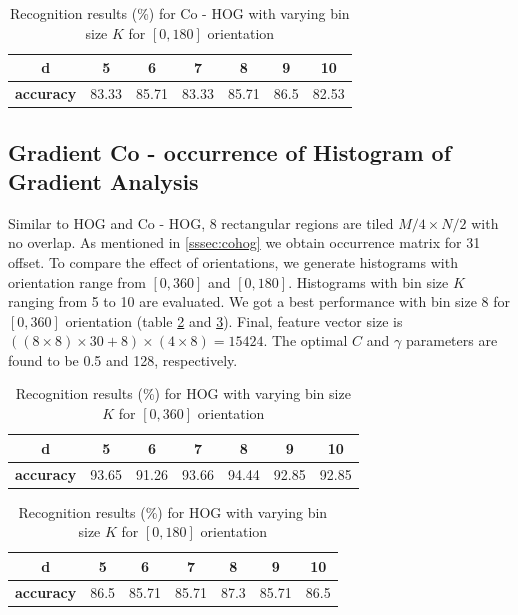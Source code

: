 \begin{table}[h] 
\begin{center}
	\caption{Recognition results (\%) for Co - HOG with varying bin size $K$ for $[0, 180]$ orientation} 
    \begin{tabular}{| c | c | c | c | c | c | c |}
    \hline
    \textbf{d} &  5  &  6  &  7  &  8  &  9  &  10\\  \hline
		 \textbf{accuracy} & 83.33 &  85.71  &  83.33  &  85.71  &  86.5  &  82.53 \\  \hline
    \end{tabular}
		\label{table:acccohog180} 
\end{center}
\end{table}

\subsection{Gradient Co - occurrence of Histogram of Gradient Analysis}
Similar to HOG and Co - HOG, 8 rectangular regions are tiled $M/4 \times N/2$ with no overlap. As mentioned in \ref{sssec:cohog} we obtain occurrence matrix for 31 offset. To compare the effect of orientations, we generate histograms with orientation range from $[0, 360]$ and $[0, 180]$. Histograms with bin size $K$ ranging from 5 to 10 are evaluated. We got a best performance with bin size 8 for $[0, 360]$ orientation (table \ref{table:accgcohog360} and \ref{table:accgcohog180}). Final, feature vector size is $((8 \times 8) \times 30 + 8) \times ( 4 \times 8) = 15424$. The optimal $C$ and $\gamma$ parameters are found to be 0.5 and 128, respectively.

\begin{table}[h] 
\begin{center}
	\caption{Recognition results (\%) for HOG with varying bin size $K$ for $[0, 360]$ orientation} 
    \begin{tabular}{| c | c | c | c | c | c | c |}
    \hline
    \textbf{d} &  5  &  6  &  7  &  8  &  9  &  10\\  \hline
		 \textbf{accuracy} & 93.65 &  91.26  &  93.66  &  94.44  &  92.85  &  92.85 \\  \hline
    \end{tabular}
		\label{table:accgcohog360} 
\end{center}
\end{table}

\begin{table}[h] 
\begin{center}
	\caption{Recognition results (\%) for HOG with varying bin size $K$ for $[0, 180]$ orientation} 
    \begin{tabular}{| c | c | c | c | c | c | c |}
    \hline
    \textbf{d} &  5  &  6  &  7  &  8  &  9  &  10\\  \hline
		 \textbf{accuracy} & 86.5 &  85.71  &  85.71  &  87.3  &  85.71  &  86.5 \\  \hline
    \end{tabular}
		\label{table:accgcohog180} 
\end{center}
\end{table}



